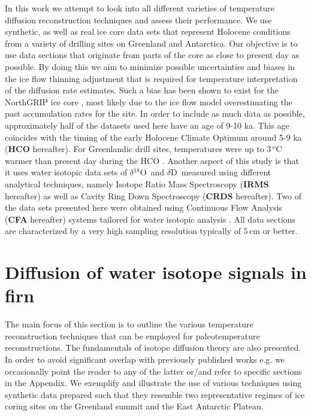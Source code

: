 \documentclass[11pt, draftcls, onecolumn]{IEEEtran} %
\numberwithin{equation}{section}
\numberwithin{table}{section}
\numberwithin{figure}{section}
\newcommand{\delOx}{$\delta{}^{18}\mathrm{O}$}
\newcommand{\delD}{$\delta\mathrm{D}$}
\begin{document}
In this work we attempt to look into all different varieties of temperature diffusion
reconstruction techniques and assess their performance. 
We use synthetic, as well as real ice core data sets that represent 
Holocene conditions from a variety of drilling sites on Greenland and Antarctica.
Our objective is to use data sections that originate from parts of the core as close to present day 
as possible. By doing this we aim to minimize possible uncertainties and biases in the ice flow thinning
adjustment that is required for temperature interpretation of the diffusion rate estimates.
Such a bias has been shown to exist for the NorthGRIP ice core \citep{Gkinis2014}, most likely 
due to the \cite{DJmodel} ice flow model overestimating  the past accumulation rates for the site. 
In order to include as much data as possible, approximately half of the datasets used here
have an age of 9-10 ka. This age coincides with the timing of the early Holocene Climate Optimum around 5-9 ka (\textbf{HCO} hereafter). 
For Greenlandic drill sites, temperatures were up to $3 \,^\mathrm{o}$C warmer than present day during the HCO \citep{Dorthe1998}.
Another aspect of this study is that it uses water isotopic data sets of \delOx~and 
\delD~measured using different analytical techniques, namely Isotope Ratio Mass Spectroscopy 
(\textbf{IRMS} hereafter) as  well as Cavity Ring Down Spectroscopy (\textbf{CRDS} hereafter).
Two of the data sets presented here were obtained using Continuous Flow Analysis (\textbf{CFA} hereafter)
systems tailored for water isotopic analysis \citep{Gkinis2011}. All data sections are characterized by
a very high sampling resolution typically of $5\, \mathrm{cm}$ or better. 




\section{Diffusion of water isotope signals in firn}

The main focus of this section is to outline 
the various temperature reconstruction techniques that can be employed for 
paleotemperature reconstructions.
The fundamentals of isotope diffusion theory are also presented. In order to avoid
significant overlap  with previously published works
e.g. \citet{Johnsen1977, Johnsen2000, Simonsen2011, Gkinis2014, vanderWel2015a} 
we occasionally  point the reader to any of the latter
or/and refer to specific sections in the Appendix.
We exemplify and illustrate the use of various techniques using synthetic data prepared such 
that they resemble  two representative regimes of ice coring sites on the Greenland summit and the 
East Antarctic Plateau. \\
\end{document}
